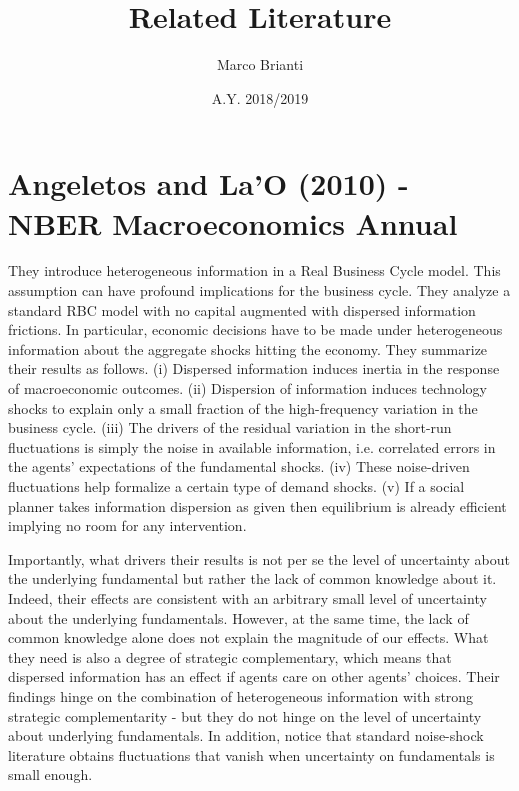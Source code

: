 \documentclass{article}
\title{Related Literature}
\author{Marco Brianti}
\date{A.Y. 2018/2019}
\begin{document}
	\large{

\maketitle

\tableofcontents

\section{Angeletos and La'O (2010) - NBER Macroeconomics Annual}

They introduce heterogeneous information in a Real Business Cycle model. This assumption can have profound implications for the business cycle. They analyze a standard RBC model with no capital augmented with dispersed information frictions. In particular, economic decisions have to be made under heterogeneous information about the aggregate shocks hitting the economy. They summarize their results as follows. (i) Dispersed information induces inertia in the response of macroeconomic outcomes. (ii) Dispersion of information induces technology shocks to explain only a small fraction of the high-frequency variation in the business cycle. (iii) The drivers of the residual variation in the short-run fluctuations is simply the noise in available information, i.e. correlated errors in the agents' expectations of the fundamental shocks. (iv) These noise-driven fluctuations help formalize a certain type of demand shocks. (v) If a social planner takes information dispersion as given then equilibrium is already efficient implying no room for any intervention.

Importantly, what drivers their results is not per se the level of uncertainty about the underlying fundamental but rather the lack of common knowledge about it. Indeed, their effects are consistent with an arbitrary small level of uncertainty about the underlying fundamentals. However, at the same time, the lack of common knowledge alone does not explain the magnitude of our effects. What they need is also a degree of strategic complementary, which means that dispersed information has an effect if agents care on other agents' choices. Their findings hinge on the combination of heterogeneous information with strong strategic complementarity - but they do not hinge on the level of uncertainty about underlying fundamentals. In addition, notice that standard noise-shock literature obtains fluctuations that vanish when uncertainty on fundamentals is small enough.

}
\end{document}
